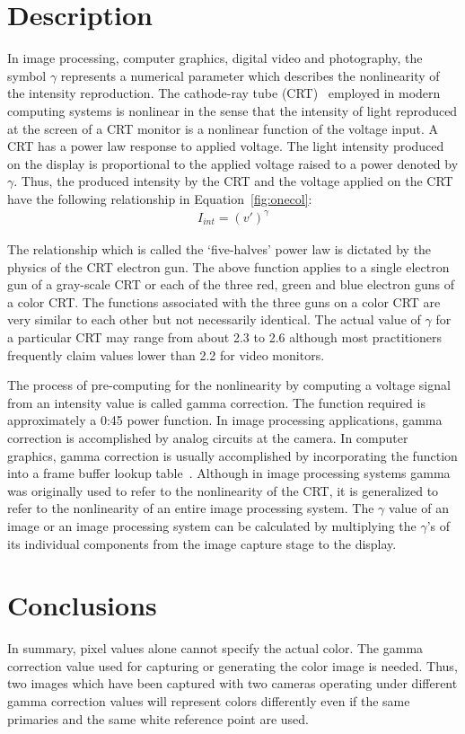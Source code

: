 \documentclass[10pt,twocolumn,letterpaper]{article}
\begin{document}
\section{Description}
In image processing, computer graphics, digital video and photography, the symbol $\gamma$ represents a numerical parameter which describes the nonlinearity of the intensity reproduction. The cathode-ray tube (CRT)~\cite{Gould1984Doing} employed in modern computing systems is nonlinear in the sense that the intensity of light reproduced at the screen of a CRT monitor is a nonlinear function of the voltage input. A CRT has a power law response to applied voltage. The light intensity produced on the display is proportional to the applied voltage raised to a power denoted by $\gamma$. Thus, the produced intensity by the CRT and the voltage applied on the CRT have the following relationship in Equation~\ref{fig:onecol}:
\begin{align}
I_{int} = (v')^{\gamma}
\label{fig:onecol}
\end{align}
\par The relationship which is called the `five-halves' power law is dictated by the physics of the CRT electron gun. The above function applies to a single electron gun of a gray-scale CRT or each of the three red, green and blue electron guns of a color CRT. The functions associated with the three guns on a color CRT are very similar to each other but not necessarily identical. The actual value of $\gamma$ for a particular CRT may range from about 2.3 to 2.6 although most practitioners frequently claim values lower than 2.2 for video monitors.
\par The process of pre-computing for the nonlinearity by computing a voltage signal from an intensity value is called gamma correction. The function required is approximately a 0:45 power function. In image processing applications, gamma correction is accomplished by analog circuits at the camera. In computer graphics, gamma correction is usually accomplished by incorporating the function into a frame buffer lookup table~\cite{Wan1990Variance}. Although in image processing systems gamma was originally used to refer to the nonlinearity of the CRT, it is generalized to refer to the nonlinearity of an entire image processing system. The $\gamma$ value of an image or an image processing system can be calculated by multiplying the $\gamma$'s of its individual components from the image capture stage to the display.

\section{Conclusions}

In summary, pixel values alone cannot specify the actual color. The gamma correction value used for capturing or generating the color image is needed. Thus, two images which have been captured with two cameras operating under different gamma correction values will represent colors differently even if the same primaries and the same white reference point are used.

{\small


}
\end{document}
